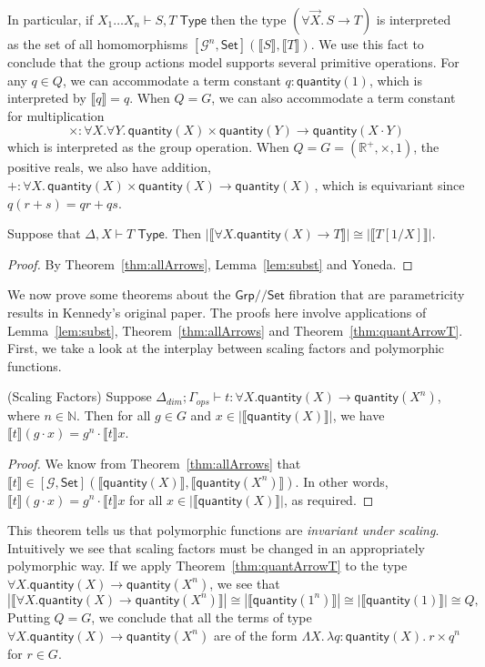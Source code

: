 \documentclass[a4paper,UKenglish]{lipics}
\theoremstyle{plain}
\newcommand{\msf}[1]{\mathsf{#1}} %
\newcommand{\Grp}{\msf{Grp}}
\newcommand{\Set}{\msf{Set}}
\newcommand{\GroupSet}[1]{[#1,\Set]}
\newcommand{\Lslice}[1]{#1/\!/\Set}
\newcommand{\GrpSet}{\Lslice{\Grp}}
\newcommand{\sem}[1]{\ensuremath{\llbracket #1 \rrbracket}}
\newcommand{\qnt}{\msf{quantity}}
\newcommand{\Deltadim}{\ensuremath{\Delta_{dim}}}
\newcommand{\Gammaops}{\ensuremath{\Gamma_{ops}}}
\newcommand{\Tj}[2]{#1 \vdash #2 \; \msf{ Type}}
\begin{document}
In particular, if $\Tj{X_1\dots X_n} {S,T}$ then
the type $(\forall \vec X.\,S\to T)$ is interpreted as the set
of all homomorphisms $\GroupSet {\mathcal G^n}(\sem S,\sem T)$.
We use this fact to conclude that the group actions model supports
several primitive operations. For any $q\in Q$, we can accommodate
a term constant $q:\qnt(1)$, which is interpreted by $\sem q=q$.
When $Q=G$,
we can also accommodate a term constant for multiplication
\[\times :\forall X.\forall Y.\,\qnt(X)\times\qnt(Y)\to\qnt(X\cdot Y)\]
which is interpreted as the group operation.
When $Q=G=(\mathbb R^+,\times,1)$, the positive reals,
we also have addition,
\ $+ :\forall X.\,\qnt(X)\times\qnt(X)\to\qnt(X)$\,,
which is equivariant since $q(r+s)=qr+qs$.
\begin{theorem}
\label{thm:quantArrowT}
Suppose that $\Delta, X \vdash T \; \msf{ Type}$. Then $|\sem{\forall
  X . \qnt(X) \rightarrow T}| \cong |\sem{T[1/X]}|$.
\end{theorem}
\begin{proof}
 By Theorem~\ref{thm:allArrows}, Lemma~\ref{lem:subst} and Yoneda.
\end{proof}



We now prove some theorems about the $\GrpSet$ fibration that are parametricity results in Kennedy's original paper. The proofs here involve applications of Lemma~\ref{lem:subst}, Theorem~\ref{thm:allArrows} and Theorem~\ref{thm:quantArrowT}. First, we take a look at the interplay between scaling factors and polymorphic functions.

\begin{theorem}(Scaling Factors)
\label{thm:ScalFact}
Suppose $\Deltadim; \Gammaops \vdash t : \forall X. \qnt(X) \rightarrow \qnt(X^n)$, where $n\in \mathbb{N}$. Then for all $g \in G$ and $x \in |\sem{\qnt(X)}|$,
we have $\sem{t} (g \cdot x) = g^n \cdot \sem{t} x$.
\end{theorem}
\begin{proof}
We know from Theorem~\ref{thm:allArrows} that
$\sem{t} \in \GroupSet{\mathcal{G}}(\sem{\qnt(X)},\sem{\qnt(X^n)})$.
In other words, $\sem{t} (g \cdot x) = g^n \cdot \sem{t} x$ for all $x \in |\sem{\qnt(X)}|$, as required.
\end{proof}
This theorem tells us that polymorphic functions are \emph{invariant under scaling}. Intuitively we see that scaling factors must be changed in an appropriately polymorphic way.
%
If we apply Theorem~\ref{thm:quantArrowT} to the type $\forall X. \qnt(X)\rightarrow \qnt(X^n)$, we see that
\[
 |\sem{\forall X. \qnt(X)\rightarrow \qnt(X^n)}| \cong |\sem{\qnt(1^n)}| \cong |\sem{\qnt(1)}| \cong Q \text{,}
\]
Putting $Q=G$, we conclude that all the terms of type $\forall X. \qnt(X)\rightarrow \qnt(X^n)$
are of the form $\Lambda X.\,\lambda q:\qnt(X).\ r\times q^n$
for $r\in G$.
\end{document}
